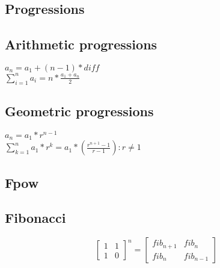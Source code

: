 
\subsection{Progressions}
\subsection*{Arithmetic progressions}
$a_n = a_1 + (n - 1) * diff$ \\
$\sum_{i = 1}^n a_i = n * \frac{a_1 + a_n}{2}$

\subsection*{Geometric progressions}
$a_n = a_1 * r^{n - 1}$ \\
$\sum_{k = 1}^{n} a_{1} * r^k = a_1 * \left( \frac{r^{n + 1} - 1}{r - 1} \right): r \neq 1$

\subsection{Fpow}

\subsection{Fibonacci}
\[
\begin{bmatrix}
    1  &  1      \\
    1  &  0      
\end{bmatrix}^{n}
= 
\begin{bmatrix}
    fib_{n+1}  &  fib_{n}      \\
    fib_{n}  &  fib_{n-1}      
\end{bmatrix} 
\]


